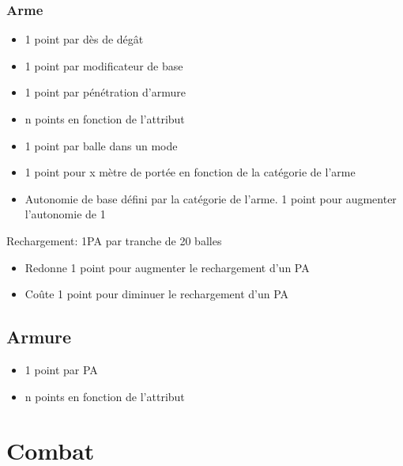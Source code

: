 \subsubsection*{Arme}
\begin{itemize}
\item 1 point par dès de dégât
\item 1 point par modificateur de base
\item 1 point par pénétration d'armure
\item n points en fonction de l'attribut
\item 1 point par balle dans un mode
\item 1 point pour x mètre de portée en fonction de la catégorie de l'arme
\item Autonomie de base défini par la catégorie de l'arme. 1 point pour augmenter l'autonomie de 1
\end{itemize}
Rechargement: 1PA par tranche de 20 balles
\begin{itemize}
\item Redonne 1 point pour augmenter le rechargement d'un PA
\item Coûte 1 point pour diminuer le rechargement d'un PA
\end{itemize}

\subsection*{Armure}

\begin{itemize}
\item 1 point par PA
\item n points en fonction de l'attribut
\end{itemize}

\section{Combat}

